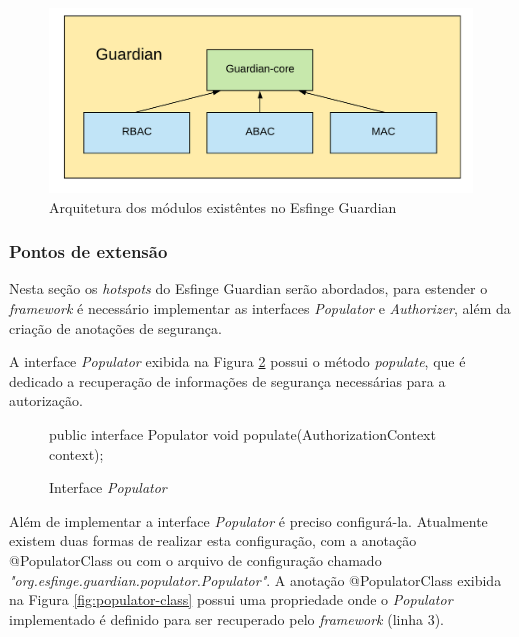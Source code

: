 \begin{figure}[H]
    \centering
    \includegraphics[scale=0.2]{src/imagens/cap2/arquitetura-modulos-guardian.png}
    \caption{Arquitetura dos módulos existêntes no Esfinge Guardian}
    \label{fig:arquitetura-guardian}
\end{figure}

\subsubsection{Pontos de extensão}

\par Nesta seção os \textit{hotspots} do Esfinge Guardian serão abordados, para estender o \textit{framework} é necessário implementar as interfaces \textit{Populator} e \textit{Authorizer}, além da criação de anotações de segurança.

\par A interface \textit{Populator} exibida na Figura \ref{fig:interface-populator} possui o método \textit{populate}, que é dedicado a recuperação de informações de segurança necessárias para a autorização. 

\begin{figure}[H]
    \centering
    \begin{java}
public interface Populator {
	void populate(AuthorizationContext context);
}
    \end{java}
    \caption{Interface \textit{Populator}}
    \label{fig:interface-populator}
\end{figure}

\par Além de implementar a interface \textit{Populator} é preciso configurá-la. Atualmente existem duas formas de realizar esta configuração, com a anotação @PopulatorClass ou com o arquivo de configuração chamado \textit{"org.esfinge.guardian.populator.Populator"}. A anotação @PopulatorClass exibida na Figura \ref{fig:populator-class} possui uma propriedade onde o \textit{Populator} implementado é definido para ser recuperado pelo \textit{framework} (linha 3).

